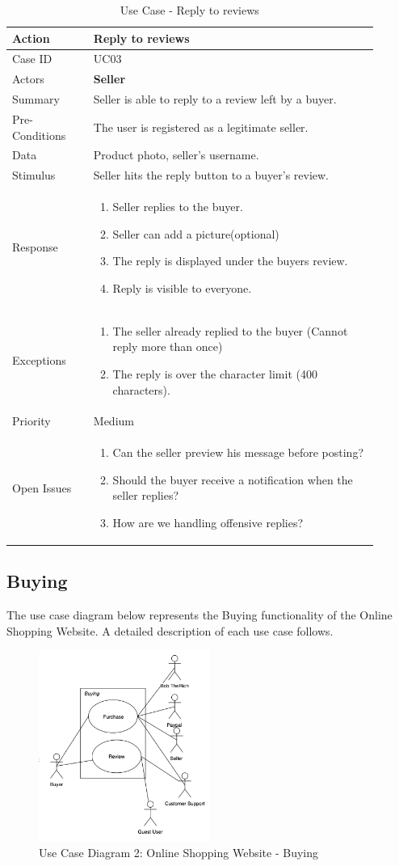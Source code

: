 \documentclass[11pt]{article}
\newcounter{use case ID}
\newcommand\tabularhead[1]{
    \begin{table}[ht]
        \addtocounter{use case ID}{1}
        \caption{Use Case \arabic{use case ID} - #1}
        \vspace{0.2cm}
        \begin{tabular}{|p{0.2\linewidth}|p{0.70\linewidth}|}
            \hline
            \textbf{Action} & \textbf{#1} \\
            \hline}
\newcommand\addrow[2]{#1 & #2\\ \hline}
\newcommand\addmulrow[2]{ \begin{minipage}[t][][t]{2.5cm}#1\end{minipage}
                &\begin{minipage}[t][][t]{11cm}
                    \begin{enumerate}[itemsep=-1ex] #2   \end{enumerate}
                \end{minipage}\vfill\\ \hline}
\newenvironment{usecase}{\tabularhead}
        {\hline\end{tabular}\end{table}}
\begin{document}
\begin{usecase}{Reply to reviews}
    \addrow{Case ID}{UC03}
    \addrow{Actors}{\textbf{Seller}}
    \addrow{Summary}{\index{seller}Seller is able to reply to a review left by a buyer.}
    \addrow{Pre-Conditions}{The user is registered as a legitimate seller. }
    \addrow{\index{data}Data}{Product photo, seller's username.}
    \addrow{Stimulus}{Seller hits the reply button to a buyer's review.}
    \addmulrow{Response}{
            \item Seller replies to the buyer.
            \item Seller can add a picture(optional)
            \item The reply is displayed under the buyers review.
            \item Reply is visible to everyone.
    }
    \addmulrow{Exceptions}{
            \item The seller already replied to the buyer (Cannot reply more than once)
            \item The reply is over the character limit (400 characters).
    }
    \addrow{Priority}{Medium}
    \addmulrow{Open Issues}{
        \item Can the seller preview his message before posting?
        \item Should the buyer receive a notification when the seller replies?
        \item How are we handling offensive replies?
    }
\end{usecase}

\clearpage

\subsection{Buying}

The use case diagram below represents the Buying functionality of the Online Shopping Website. A detailed description of each use case follows.

\begin{figure}[htbp]
    \centering
    \includegraphics[width=0.5\textwidth]{Diagrams/Use_Case/ucd2.png}
    \caption{Use Case Diagram 2: Online Shopping Website - Buying }
    \label{fig:ucd2}
\end{figure}
\end{document}
